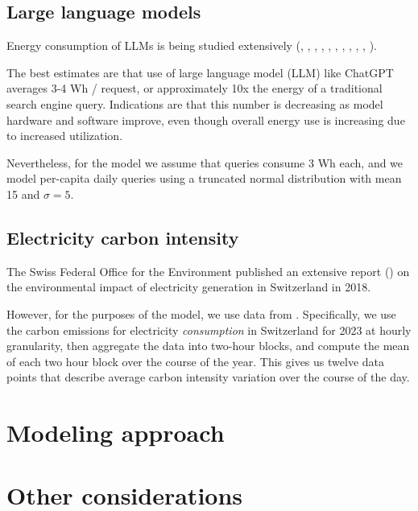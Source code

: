 \documentclass[11pt]{article}
\begin{document}
\subsection{Large language models}

Energy consumption of LLMs is being studied extensively (\textcite{budennyy2022eco2ai},
\textcite{castano2023exploring},
\textcite{devries2023growing},
\textcite{gowda2024watt},
\textcite{harding2024watts}, 
\textcite{heguerte2023estimate},
\textcite{luccioni2022estimating},
\textcite{luccioni2023counting},
\textcite{patterson2021carbon}, 
\textcite{rodriguez2024evaluating},
\textcite{tripp2024measuring}). 

The best estimates are that use of large language model (LLM) like ChatGPT averages 3-4 Wh / request,
or approximately 10x the energy of a traditional search engine query. Indications are that this
number is decreasing as model hardware and software improve, even though overall energy use is increasing
due to increased utilization.

Nevertheless, for the model we assume that queries consume 3 Wh each, and we model per-capita daily
queries using a truncated normal distribution with mean 15 and $\sigma = 5$.

\subsection{Electricity carbon intensity}

The Swiss Federal Office for the Environment published an extensive report (\textcite{krebs2018umweltbilanz})
on the environmental impact of electricity generation in Switzerland in 2018.

However, for the purposes of the model, we use data from \textcite{electricitymaps}. Specifically,
we use the carbon emissions for electricity {\em consumption} in Switzerland for 2023 at hourly
granularity, then aggregate the data into two-hour blocks, and compute the mean of each two
hour block over the course of the year. This gives us twelve data points that describe average
carbon intensity variation over the course of the day.

\section{Modeling approach}

\section{Other considerations}
\end{document}
